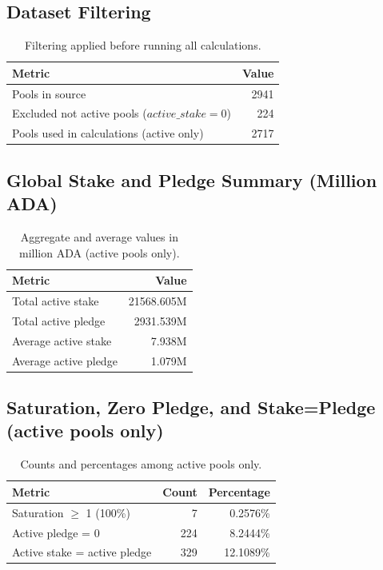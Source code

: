 \subsection*{Dataset Filtering}
\begin{table}[h]
\centering
\begin{tabular}{lr}
\toprule
Metric & Value \\
\midrule
Pools in source & 2941 \\
Excluded not active pools ($active\_stake=0$) & 224 \\
Pools used in calculations (active only) & 2717 \\
\bottomrule
\end{tabular}
\caption{Filtering applied before running all calculations.}
\end{table}

\subsection*{Global Stake and Pledge Summary (Million ADA)}
\begin{table}[h]
\centering
\begin{tabular}{lr}
\toprule
Metric & Value \\
\midrule
Total active stake & 21568.605M \\
Total active pledge & 2931.539M \\
Average active stake & 7.938M \\
Average active pledge & 1.079M \\
\bottomrule
\end{tabular}
\caption{Aggregate and average values in million ADA (active pools only).}
\end{table}

\subsection*{Saturation, Zero Pledge, and Stake=Pledge (active pools only)}
\begin{table}[h]
\centering
\begin{tabular}{lrr}
\toprule
Metric & Count & Percentage \\
\midrule
Saturation $\geq$ 1 (100\%) & 7 & 0.2576\% \\
Active pledge = 0 & 224 & 8.2444\% \\
Active stake = active pledge & 329 & 12.1089\% \\
\bottomrule
\end{tabular}
\caption{Counts and percentages among active pools only.}
\end{table}

